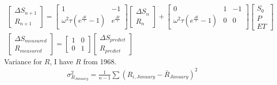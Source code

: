 \begin{gather*}
	\begin{bmatrix}
		\Delta S_{n+1} \\
		R_{n+1}
	\end{bmatrix} = \begin{bmatrix}
	1 & -1 \\
	\omega^2 \tau (e^{\frac{\Delta t}{\tau}} - 1) & e^{\frac{\Delta t}{\tau}} \end{bmatrix} \begin{bmatrix}
		\Delta S_{n} \\
		R_{n}
	\end{bmatrix} + \begin{bmatrix}
	0 & 1 & -1\\
	\omega^2 \tau (e^{\frac{\Delta t}{\tau}} - 1) & 0 & 0
\end{bmatrix} \begin{bmatrix}
S_0 \\
P \\
ET
\end{bmatrix} \\
\begin{bmatrix}
	\Delta S_{measured} \\
	R_{measured}
\end{bmatrix} = \begin{bmatrix}
	1 & 0 \\
	0 & 1
\end{bmatrix} \begin{bmatrix}
	\Delta S_{predict} \\
	R_{predict} 
\end{bmatrix} 
\end{gather*}
Variance for $R$, I have $R$ from 1968.
\begin{gather*}
	\sigma^2_{R_{January}} = \frac{1}{n-1}\sum (R_{i,January} - \bar{R}_{January})^2
\end{gather*}